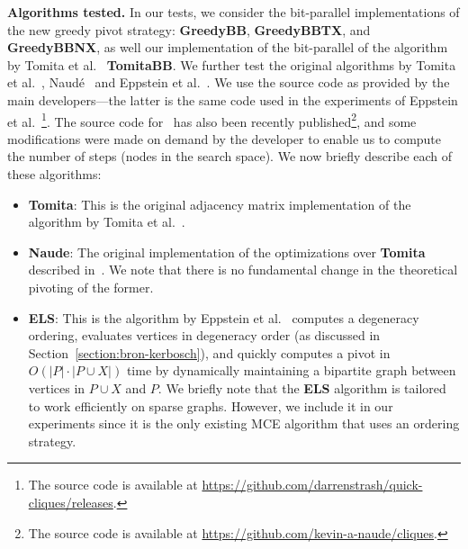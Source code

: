 \documentclass[final,1p]{elsarticle-modified}
\renewcommand{\paragraph}[1]{\medskip\noindent\textbf{#1.}}
\newcommand{\alg}[1]{\textbf{#1}}
\begin{document}
\paragraph{Algorithms tested}
In our tests, we consider the bit-parallel implementations of the new greedy pivot strategy: \alg{GreedyBB}, \alg{GreedyBBTX}, and \alg{GreedyBBNX}, as well our implementation of the bit-parallel of the algorithm by Tomita et al.~\cite{tomita-2006} \alg{TomitaBB}. We further test the original algorithms by Tomita et al.~\cite{tomita-2006}, Naud\'e~\cite{naude-2016} and Eppstein et al.~\cite{els-2013}. We use the source code as provided by the main developers---the latter is the same code used in the experiments of Eppstein et al.~\cite{els-2013}\footnote{The source code is available at \url{https://github.com/darrenstrash/quick-cliques/releases}.}. The source code for~\cite{naude-2016} has also been recently published\footnote{The source code is available at \url{https://github.com/kevin-a-naude/cliques}.}, and some modifications were made on demand by the developer to enable us to compute the number of steps (nodes in the search space). We now briefly describe each of these algorithms:




\begin{itemize}
\item \alg{Tomita}: This is the original adjacency matrix implementation of the algorithm by Tomita et al.~\cite{tomita-2006}.
\item \alg{Naude}: The original implementation of the optimizations over \alg{Tomita} described in~\cite{naude-2016}. We note that there is no fundamental change in the theoretical pivoting of the former.
\item \alg{ELS}: This is the algorithm by Eppstein et al.~\cite{els-2013} computes a degeneracy ordering, evaluates vertices in degeneracy order (as discussed in Section~\ref{section:bron-kerbosch}), and quickly computes a pivot in $O(|P|\cdot|P\cup X|)$ time by dynamically maintaining a bipartite graph between vertices in $P\cup X$ and $P$. We briefly note that the \alg{ELS} algorithm is tailored to work efficiently on sparse graphs. However, we include it in our experiments since it is the only existing MCE algorithm that uses an ordering strategy.
\end{itemize}
\end{document}

